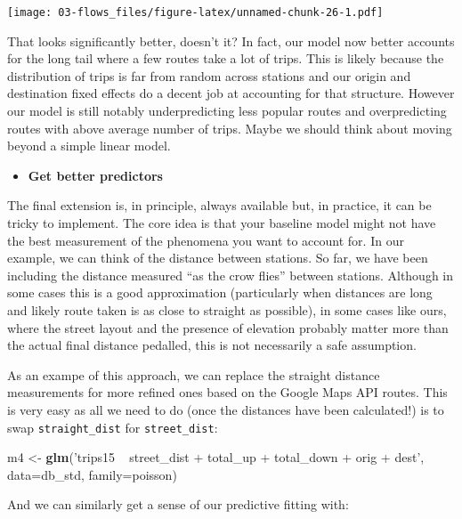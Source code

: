 \documentclass[]{book}
\newenvironment{Shaded}{\begin{snugshade}}{\end{snugshade}}
\newcommand{\KeywordTok}[1]{\textcolor[rgb]{0.13,0.29,0.53}{\textbf{#1}}}
\newcommand{\DataTypeTok}[1]{\textcolor[rgb]{0.13,0.29,0.53}{#1}}
\newcommand{\StringTok}[1]{\textcolor[rgb]{0.31,0.60,0.02}{#1}}
\newcommand{\NormalTok}[1]{#1}
\providecommand{\tightlist}{%
  \setlength{\itemsep}{0pt}\setlength{\parskip}{0pt}}
\begin{document}
\texttt{[image: 03-flows\_files/figure-latex/unnamed-chunk-26-1.pdf]}

That looks significantly better, doesn't it? In fact, our model now
better accounts for the long tail where a few routes take a lot of
trips. This is likely because the distribution of trips is far from
random across stations and our origin and destination fixed effects do a
decent job at accounting for that structure. However our model is still
notably underpredicting less popular routes and overpredicting routes
with above average number of trips. Maybe we should think about moving
beyond a simple linear model.

\begin{itemize}
\tightlist
\item
  \textbf{Get better predictors}
\end{itemize}

The final extension is, in principle, always available but, in practice,
it can be tricky to implement. The core idea is that your baseline model
might not have the best measurement of the phenomena you want to account
for. In our example, we can think of the distance between stations. So
far, we have been including the distance measured ``as the crow flies''
between stations. Although in some cases this is a good approximation
(particularly when distances are long and likely route taken is as close
to straight as possible), in some cases like ours, where the street
layout and the presence of elevation probably matter more than the
actual final distance pedalled, this is not necessarily a safe
assumption.

As an exampe of this approach, we can replace the straight distance
measurements for more refined ones based on the Google Maps API routes.
This is very easy as all we need to do (once the distances have been
calculated!) is to swap \texttt{straight\_dist} for
\texttt{street\_dist}:

\begin{Shaded}
\begin{Highlighting}[]
\NormalTok{m4 <-}\StringTok{ }\KeywordTok{glm}\NormalTok{(}\StringTok{'trips15 ~ street_dist + total_up + total_down + orig + dest'}\NormalTok{, }
          \DataTypeTok{data=}\NormalTok{db_std,}
          \DataTypeTok{family=}\NormalTok{poisson)}
\end{Highlighting}
\end{Shaded}

And we can similarly get a sense of our predictive fitting with:
\end{document}
